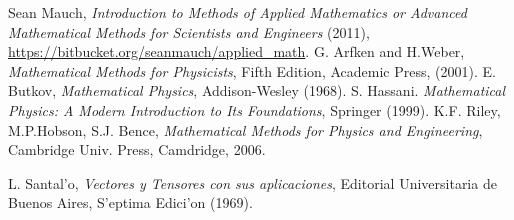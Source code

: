 \begin{thebibliography}{99}
 Sean Mauch, {\em Introduction to Methods of Applied Mathematics                           or Advanced Mathematical Methods for Scientists and Engineers} (2011), \url{https://bitbucket.org/seanmauch/applied_math}.
 G. Arfken and H.Weber, {\em Mathematical Methods for Physicists}, Fifth Edition, Academic Press, (2001).
 E. Butkov, {\em Mathematical Physics}, Addison-Wesley (1968).
 S. Hassani. {\em Mathematical Physics: A Modern Introduction to Its Foundations}, Springer (1999).
 K.F. Riley, M.P.Hobson, S.J. Bence, \textit{Mathematical Methods for Physics and Engineering}, Cambridge Univ. Press, Camdridge, 2006.
\item L. Santal'o, {\em Vectores y Tensores con sus aplicaciones}, Editorial Universitaria de Buenos Aires, S'eptima Edici'on (1969).

\end{thebibliography}
